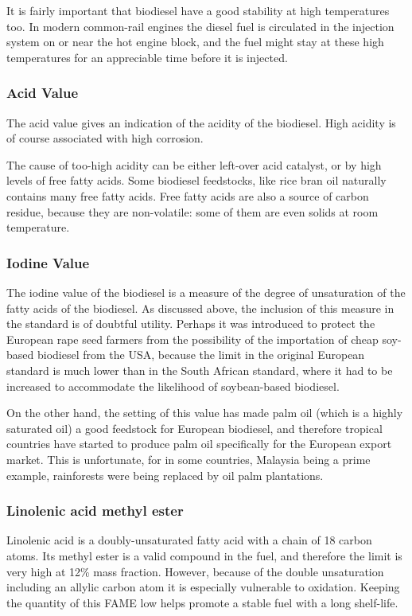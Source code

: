 It is fairly important that biodiesel have a good stability at high temperatures too. In modern common-rail engines the diesel fuel is circulated in the injection system on or near the hot engine block, and the fuel might stay at these high temperatures for an appreciable time before it is injected.

\subsubsection{Acid Value}

The acid value gives an indication of the acidity of the biodiesel. High acidity is of course associated with high corrosion.

The cause of too-high acidity can be either left-over acid catalyst, or by high levels of free fatty acids. Some biodiesel feedstocks, like rice bran oil naturally contains many free fatty acids. Free fatty acids are also a source of carbon residue, because they are non-volatile: some of them are even solids at room temperature.

\subsubsection{Iodine Value}

The iodine value of the biodiesel is a measure of the degree of unsaturation of the fatty acids of the biodiesel. As discussed above, the inclusion of this measure in the standard is of doubtful utility. Perhaps it was introduced to protect the European rape seed farmers from the possibility of the importation of cheap soy-based biodiesel from the USA, because the limit in the original European standard is much lower than in the South African standard, where it had to be increased to accommodate the likelihood of soybean-based biodiesel. 

On the other hand, the setting of this value has made palm oil (which is a highly saturated oil) a good feedstock for European biodiesel, and therefore tropical countries have started to produce palm oil specifically for the European export market. This is unfortunate, for in some countries, Malaysia being a prime example, rainforests were being replaced by oil palm plantations.

\subsubsection{Linolenic acid methyl ester}

Linolenic acid is a doubly-unsaturated fatty acid with a chain of 18 carbon atoms. Its methyl ester is a valid compound in the fuel, and therefore the limit is very high at 12\% mass fraction. However, because of the double unsaturation including an allylic carbon atom it is especially vulnerable to oxidation. Keeping the quantity of this FAME low helps promote a stable fuel with a long shelf-life.

